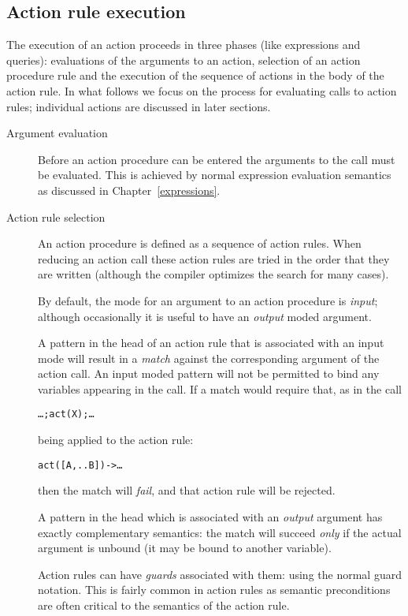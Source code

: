 \subsection{Action rule execution}
\label{action:evaluate}
The execution of an action proceeds in three phases (like expressions and queries): evaluations of the arguments to an action, selection of an action procedure rule and the execution of the sequence of actions in the body of the action rule. In what follows we focus on the process for evaluating calls to action rules; individual actions are discussed in later sections.

\begin{description}
\item[Argument evaluation]
Before an action procedure can be entered the arguments to the call must be evaluated. This is achieved by normal expression evaluation semantics as discussed in Chapter~\vref{expressions}.

\item[Action rule selection]

An action procedure is defined as a sequence of action rules. When reducing an action call these action rules are tried in the order that they are written (although the compiler optimizes the search for many cases).

By default, the mode for an argument to an action procedure is \emph{input}; although occasionally it is useful to have an \emph{output} moded argument.

A pattern in the head of an action rule that is associated with an input mode will result in a \emph{match} against the corresponding argument of the action call. An input moded pattern will not be permitted to bind any variables appearing in the call. If a match would require that, as in the call
\begin{alltt}
\ldots{};act(X);\ldots{}
\end{alltt}
being applied to the action rule:
\begin{alltt}
act([A,..B]) -> \ldots
\end{alltt}
then the match will \emph{fail}, and that action rule will be rejected.

A pattern in the head which is associated with an \emph{output} argument has exactly complementary semantics: the match will succeed \emph{only} if the actual argument is unbound (it may be bound to another variable).

Action rules can have \emph{guards} associated with them: using the normal guard \q{::} notation. This is fairly common in action rules as semantic preconditions are often critical to the semantics of the action rule.


\end{description}
